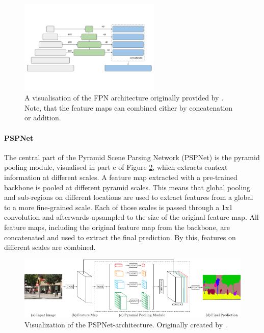 \begin{figure}[htb!]
	\centering
	\includegraphics[width=0.6\textwidth]{fig/fpn-architecture.png}
	\caption{A visualisation of the FPN architecture originally provided by \citeauthor{SegmentationModels} \cite{SegmentationModels}. Note, that the feature maps can combined either by concatenation or addition.}
	\label{fig:fpn-architecture}
\end{figure}


\paragraph{PSPNet}

The central part of the Pyramid Scene Parsing Network (PSPNet) is the pyramid pooling module, visualised in part c of Figure \ref{fig:pspnet-architecture}, which extracts context information at different scales. A feature map extracted with a pre-trained backbone is pooled at different pyramid scales. This means that global pooling and sub-regions on different locations are used to extract features from a global to a more fine-grained scale. Each of those scales is passed through a 1x1 convolution and afterwards upsampled to the size of the original feature map. All feature maps, including the original feature map from the backbone, are concatenated and used to extract the final prediction. By this, features on different scales are combined. \cite{Zhao2017, ArcGIS}

\begin{figure}[htb!]
	\centering
	\includegraphics[width=\textwidth]{fig/pspnet-architecture.png}
	\caption{Visualization of the PSPNet-architecture. Originally created by \citeauthor{Zhao2017} \cite{Zhao2017}.}
	\label{fig:pspnet-architecture}
\end{figure}

